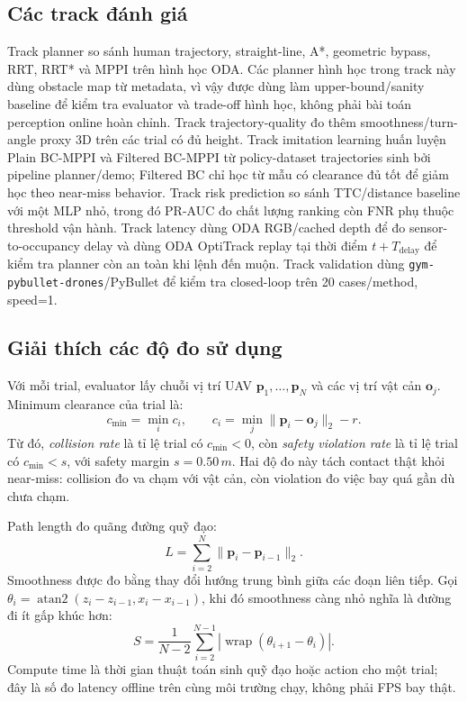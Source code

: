 \documentclass[10pt,letterpaper,twocolumn]{article}
\newcommand{\code}[1]{\texttt{#1}}
\begin{document}
\subsection{Các track đánh giá}
Track planner so sánh human trajectory, straight-line, A*, geometric bypass, RRT, RRT* và MPPI trên hình học ODA. Các planner hình học trong track này dùng obstacle map từ metadata, vì vậy được dùng làm upper-bound/sanity baseline để kiểm tra evaluator và trade-off hình học, không phải bài toán perception online hoàn chỉnh. Track trajectory-quality đo thêm smoothness/turn-angle proxy 3D trên các trial có đủ height. Track imitation learning huấn luyện Plain BC-MPPI và Filtered BC-MPPI từ policy-dataset trajectories sinh bởi pipeline planner/demo; Filtered BC chỉ học từ mẫu có clearance đủ tốt để giảm học theo near-miss behavior. Track risk prediction so sánh TTC/distance baseline với một MLP nhỏ, trong đó PR-AUC đo chất lượng ranking còn FNR phụ thuộc threshold vận hành. Track latency dùng ODA RGB/cached depth để đo sensor-to-occupancy delay và dùng ODA OptiTrack replay tại thời điểm \(t+T_{\mathrm{delay}}\) để kiểm tra planner còn an toàn khi lệnh đến muộn. Track validation dùng \code{gym-pybullet-drones}/PyBullet \cite{gymPybullet} để kiểm tra closed-loop trên 20 cases/method, speed=1.

\subsection{Giải thích các độ đo sử dụng}
Với mỗi trial, evaluator lấy chuỗi vị trí UAV \(\mathbf{p}_1,\ldots,\mathbf{p}_N\) và các vị trí vật cản \(\mathbf{o}_j\). Minimum clearance của trial là:
\[
  c_{\min}=\min_i c_i,\qquad
  c_i=\min_j\|\mathbf{p}_i-\mathbf{o}_j\|_2-r.
\]
Từ đó, \textit{collision rate} là tỉ lệ trial có \(c_{\min}<0\), còn \textit{safety violation rate} là tỉ lệ trial có \(c_{\min}<s\), với safety margin \(s=0.50\,m\). Hai độ đo này tách contact thật khỏi near-miss: collision đo va chạm với vật cản, còn violation đo việc bay quá gần dù chưa chạm.

Path length đo quãng đường quỹ đạo:
\[
  L=\sum_{i=2}^{N}\|\mathbf{p}_i-\mathbf{p}_{i-1}\|_2.
\]
Smoothness được đo bằng thay đổi hướng trung bình giữa các đoạn liên tiếp. Gọi \(\theta_i=\operatorname{atan2}(z_i-z_{i-1},x_i-x_{i-1})\), khi đó smoothness càng nhỏ nghĩa là đường đi ít gấp khúc hơn:
\[
  S=\frac{1}{N-2}\sum_{i=2}^{N-1}\left|\operatorname{wrap}(\theta_{i+1}-\theta_i)\right|.
\]
Compute time là thời gian thuật toán sinh quỹ đạo hoặc action cho một trial; đây là số đo latency offline trên cùng môi trường chạy, không phải FPS bay thật.
\end{document}

